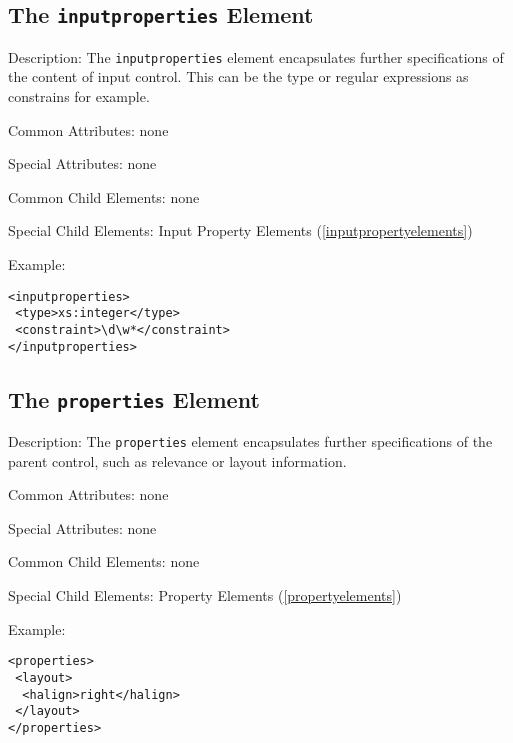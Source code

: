 \subsection{ The \texttt{inputproperties} Element}
\label{inputproperties}
\begin{description}
 \item Description: The \texttt{inputproperties} element encapsulates further specifications of the content of input control. This can be the type or regular expressions as constrains for example.

 \item Common Attributes: none

 \item Special Attributes: none

 \item Common Child Elements: none

 \item Special Child Elements: Input Property Elements (\ref{inputpropertyelements})

 \item Example: 

\begin{lstlisting}[caption=\texttt{properties} Element]
<inputproperties>
 <type>xs:integer</type>
 <constraint>\d\w*</constraint>
</inputproperties>
\end{lstlisting}
\end{description}




\subsection{ The \texttt{properties} Element}
\label{properties}
\begin{description}
 \item Description: The \texttt{properties} element encapsulates further specifications of the parent control, such as relevance or layout information.

 \item Common Attributes: none

 \item Special Attributes: none

 \item Common Child Elements: none

 \item Special Child Elements: Property Elements (\ref{propertyelements})

 \item Example: 

\begin{lstlisting}[caption=\texttt{properties} Element]
<properties>
 <layout>
  <halign>right</halign>
 </layout>
</properties>
\end{lstlisting}
\end{description}
